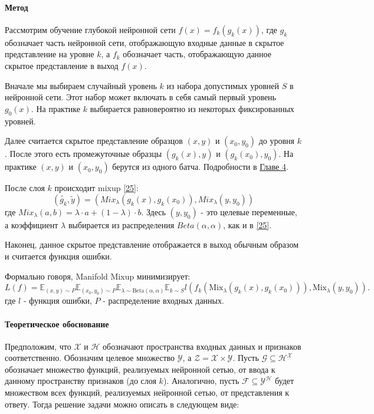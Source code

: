 \paragraph{Метод}
Рассмотрим обучение глубокой нейронной сети $f(x) = f_k(g_k(x))$, где $g_k$ обозначает часть нейронной сети, отображающую входные данные в скрытое представление на уровне $k$, а $f_k$ обозначает часть, отображающую данное скрытое представление в выход $f(x)$. 

Вначале мы выбираем случайный уровень $k$ из набора допустимых уровней $S$ в нейронной сети. Этот набор может включать в себя самый первый уровень $g_0(x)$. На практике $k$ выбирается равновероятно из некоторых фиксированных уровней.

Далее считается скрытое представление образцов $(x, y)$ и $(x_0, y_0)$ до уровня $k$. После этого есть промежуточные образцы $(g_k(x), y)$ и $(g_k(x_0), y_0)$. На практике $(x, y)$ и $(x_0, y_0)$ берутся из одного батча. Подробности в \hyperref[sec:Chapter3]{Главе 4}.

После слоя $k$ происходит mixup \hyperlink{cite.Hon17}{[25]}:
\begin{equation}
    (\tilde{g_k}, \tilde{y}) = (Mix_{\lambda}(g_k(x), g_k(x_0)), Mix_{\lambda}(y, y_0))
\end{equation}
где $Mix_{\lambda}(a, b) = \lambda \cdot a + (1 - \lambda) \cdot b$. Здесь $(y, y_0)$ - это целевые переменные, а коэффициент $\lambda$ выбирается из распределения $Beta(\alpha, \alpha)$, как и в \hyperlink{cite.Hon17}{[25]}.

Наконец, данное скрытое представление отображается в выход обычным образом и считается функция ошибки.

Формально говоря, Manifold Mixup минимизирует:
\begin{equation}
L(f) = \mathbb{E}_{(x,y) \sim P} \mathbb{E}_{(x_0, y_0) \sim P} \mathbb{E}_{\lambda \sim \text{Beta}(\alpha, \alpha)} \mathbb{E}_{k \sim S} l( f_k\left( \text{Mix}_{\lambda}(g_k(x), g_k(x_0)) \right), \text{Mix}_{\lambda}(y, y_0)).
\end{equation}
где $l$ - функция ошибки, $P$ - распределение входных данных.

\paragraph{Теоретическое обоснование}
Предположим, что $\mathcal{X}$ и $\mathcal{H}$ обозначают пространства входных данных и признаков соответственно. Обозначим целевое множество $\mathcal{Y}$, а $\mathcal{Z} = \mathcal{X} \times \mathcal{Y}$. Пусть $\mathcal{G} \subseteq \mathcal{H}^\mathcal{X}$ обозначает множество функций, реализуемых нейронной сетью, от ввода к данному пространству признаков (до слоя $k$). Аналогично, пусть $\mathcal{F} \subseteq \mathcal{Y}^\mathcal{H}$ будет множеством всех функций, реализуемых нейронной сетью, от представления к ответу. Тогда решение задачи можно описать в следующем виде:

